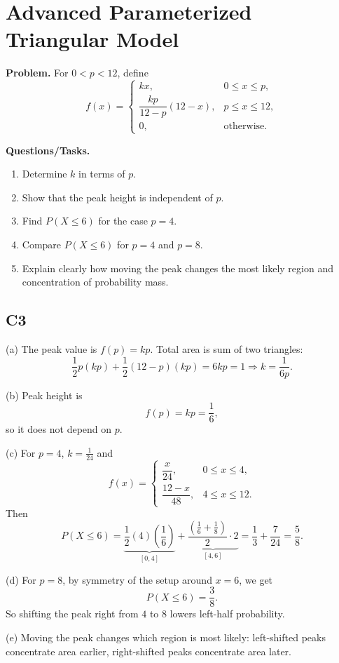 \section{Advanced Parameterized Triangular Model}

\textbf{Problem.}
For $0<p<12$, define
\[
f(x)=\begin{cases}
kx, & 0\le x\le p,\\
\dfrac{kp}{12-p}(12-x), & p\le x\le 12,\\
0, & \text{otherwise.}
\end{cases}
\]

\textbf{Questions/Tasks.}
\begin{enumerate}[label=(\alph*)]
\item Determine $k$ in terms of $p$.
\item Show that the peak height is independent of $p$.
\item Find $P(X\le 6)$ for the case $p=4$.
\item Compare $P(X\le 6)$ for $p=4$ and $p=8$.
\item Explain clearly how moving the peak changes the most likely region and concentration of probability mass.
\end{enumerate}

\subsection*{C3}
(a) The peak value is $f(p)=kp$.
Total area is sum of two triangles:
\[
\frac12 p(kp)+\frac12(12-p)(kp)=6kp=1
\Rightarrow
k=\frac{1}{6p}.
\]

(b) Peak height is
\[
f(p)=kp=\frac{1}{6},
\]
so it does not depend on $p$.

(c) For $p=4$, $k=\frac{1}{24}$ and
\[
f(x)=\begin{cases}
\dfrac{x}{24}, & 0\le x\le 4,\\
\dfrac{12-x}{48}, & 4\le x\le 12.
\end{cases}
\]
Then
\[
P(X\le 6)=\underbrace{\frac12(4)\left(\frac16\right)}_{[0,4]}+\underbrace{\frac{\left(\frac16+\frac18\right)}{2}\cdot2}_{[4,6]}=\frac13+\frac{7}{24}=\frac58.
\]

(d) For $p=8$, by symmetry of the setup around $x=6$, we get
\[
P(X\le 6)=\frac38.
\]
So shifting the peak right from $4$ to $8$ lowers left-half probability.

(e) Moving the peak changes which region is most likely: left-shifted peaks concentrate area earlier, right-shifted peaks concentrate area later.

